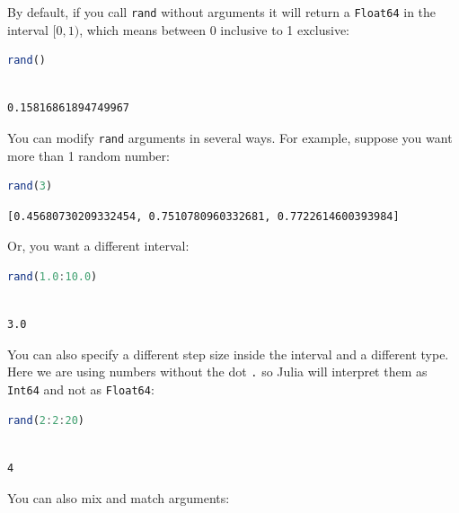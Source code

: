 \documentclass[
  notoc %
]{tufte-book}
\newcommand{\passthrough}[1]{#1}
\begin{document}
By default, if you call \passthrough{\lstinline!rand!} without arguments
it will return a \passthrough{\lstinline!Float64!} in the interval
\([0, 1)\), which means between 0 inclusive to 1 exclusive:

\begin{lstlisting}[language=Julia]
rand()
\end{lstlisting}

\begin{lstlisting}[language=Output]

0.15816861894749967

\end{lstlisting}

You can modify \passthrough{\lstinline!rand!} arguments in several ways.
For example, suppose you want more than 1 random number:

\begin{lstlisting}[language=Julia]
rand(3)
\end{lstlisting}

\begin{lstlisting}[language=Output]
[0.45680730209332454, 0.7510780960332681, 0.7722614600393984]
\end{lstlisting}

Or, you want a different interval:

\begin{lstlisting}[language=Julia]
rand(1.0:10.0)
\end{lstlisting}

\begin{lstlisting}[language=Output]

3.0

\end{lstlisting}

You can also specify a different step size inside the interval and a
different type. Here we are using numbers without the dot
\passthrough{\lstinline!.!} so Julia will interpret them as
\passthrough{\lstinline!Int64!} and not as
\passthrough{\lstinline!Float64!}:

\begin{lstlisting}[language=Julia]
rand(2:2:20)
\end{lstlisting}

\begin{lstlisting}[language=Output]

4

\end{lstlisting}

You can also mix and match arguments:
\end{document}
